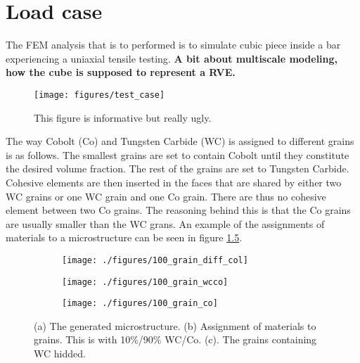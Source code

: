 \documentclass[load_case.tex]{subfiles}
\begin{document}
\chapter{Load case}

The FEM analysis that is to performed is to simulate cubic piece inside a bar experiencing a uniaxial tensile testing. \textbf{A bit about multiscale modeling, how the cube is supposed to represent a RVE.} 




\begin{figure}[ht]
\centering
\texttt{[image: figures/test\_case]}
\caption{This figure is informative but really ugly.}
\label{fig:test_case}
\end{figure}




The way Cobolt (Co) and Tungsten Carbide (WC) is assigned to different grains is as follows. The smallest grains are set to contain Cobolt until they constitute the desired volume fraction. The rest of the grains are set to Tungsten Carbide. Cohesive elements are then inserted in the faces that are shared by either two WC grains or one WC grain and one Co grain. There are thus no cohesive element between two Co grains. The reasoning behind this is that the Co grains are usually smaller than the WC grans.  An example of the assignments of materials to a microstructure can be seen in figure \ref{fig:cowc}.

\begin{figure}
\centering
\begin{subfigure}[b]{.5\textwidth}
  \centering
  \texttt{[image: ./figures/100\_grain\_diff\_col]}
  \caption{}
  \label{fig:cowc_a}
\end{subfigure}%
\hspace{-10mm}
\begin{subfigure}[b]{.5\textwidth}
  \centering
  \texttt{[image: ./figures/100\_grain\_wcco]}
  \caption{}
  \label{fig:cowc_b}
\end{subfigure}%
\hspace{-10mm}
\begin{subfigure}[b]{.5\textwidth}
  \centering
  \texttt{[image: ./figures/100\_grain\_co]}
  \caption{}
  \label{fig:cowc_c}
\end{subfigure}
\caption{(a) The generated microstructure. (b) Assignment of materials to grains. This is with 10\%/90\% WC/Co. (c). The grains containing WC hidded.}
\label{fig:cowc}
\end{figure}
\end{document}

